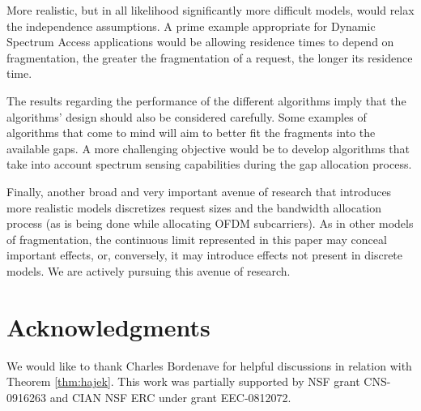 \documentclass{amsart}
\begin{document}
More realistic, but in all likelihood significantly more difficult
models, would relax the independence assumptions.  A prime example
appropriate for Dynamic Spectrum Access applications would be allowing
residence times to depend on fragmentation, the greater the
fragmentation of a request, the longer its residence time.

The results regarding the performance of the different algorithms imply that the algorithms' design should also be considered carefully. Some examples of algorithms that come to mind will aim to better fit the fragments into the available gaps. A more challenging objective would be to develop algorithms that take into account spectrum sensing capabilities during the gap allocation process.

Finally, another broad and very important avenue of research that
introduces more realistic models discretizes request sizes and the
bandwidth allocation process (as is being done while allocating OFDM subcarriers).  As in other models of fragmentation,
the continuous limit represented in this paper may conceal important
effects, or, conversely, it may introduce effects not present in
discrete models.  We are actively pursuing this avenue of research.

\section{Acknowledgments}
We would like to thank Charles Bordenave for helpful discussions in relation with Theorem \ref{thm:hajek}.
This work was partially supported by NSF grant CNS-0916263 and CIAN NSF ERC under grant EEC-0812072.
\end{document}

